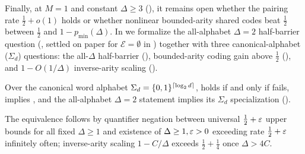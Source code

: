 Finally, at $M = 1$ and constant $\Delta \ge 3$ (\cite[Problem~9.4(b)]{SeventeenthPaper2026}), it
remains open whether the pairing rate $\frac{1}{2} + o(1)$ holds or whether nonlinear bounded-arity
shared codes beat $\frac{1}{2}$ between $\frac{1}{2}$ and $1 - p_{\min}(\Delta)$. In
 we formalize the all-alphabet $\Delta = 2$ half-barrier
question (, settled on paper for $\mathcal{E} = \emptyset$
in \cite[Proposition~6.22(b)]{SeventeenthPaper2026}) together with three canonical-alphabet
($\Sigma_d$) questions: the all-$\Delta$ half-barrier (),
bounded-arity coding gain above $\frac{1}{2}$
(), and $1 - O(1/\Delta)$ inverse-arity scaling
().

\begin{proposition}[Logical dichotomy for $M = 1, \Delta = O(1)$ capacity]\label{prop:half-barrier-dichotomy}
Over the canonical word alphabet $\Sigma_d = \{0,1\}^{\lceil \log_2 d \rceil}$,
 holds if and only if
 fails,
 implies
, and the all-alphabet $\Delta = 2$ statement
 implies its $\Sigma_d$ specialization
().
\end{proposition}
\begin{outline}
The equivalence follows by quantifier negation between universal $\frac{1}{2} + \varepsilon$ upper bounds
for all fixed $\Delta \ge 1$ and existence of $\Delta \ge 1, \varepsilon > 0$ exceeding rate
$\frac{1}{2} + \varepsilon$ infinitely often; inverse-arity scaling $1 - C/\Delta$ exceeds $\frac{1}{2} +
\frac{1}{4}$ once $\Delta > 4C$.
\end{outline}
